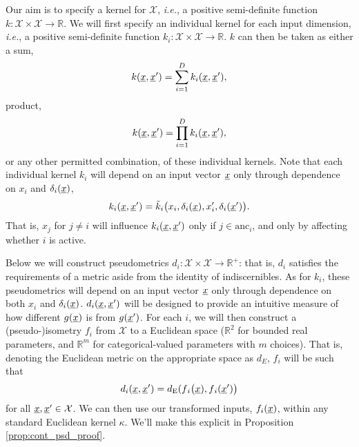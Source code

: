 \documentclass[letterpaper]{article}
\newcommand{\vect}[1]{\underline{\smash{#1}}}
\renewcommand{\v}[1]{\vect{#1}}
\newcommand{\reals}{\mathds{R}}
\newcommand{\sX}{\mathcal{X}}
\begin{document}
Our aim is to specify a kernel for $\sX$, \emph{i.e.}, a positive semi-definite function  $k\colon \sX \times \sX \to \reals$. We will first specify an individual kernel for each input dimension, \emph{i.e.}, a positive semi-definite function $k_i\colon \sX \times \sX \to \reals$. $k$ can then be taken as either a sum,
\begin{equation}
 k(\v{x}, \v{x}') = \sum_{i=1}^D k_i(\v{x},\v{x}'),
\end{equation}
product,
\begin{equation}
 k(\v{x}, \v{x}') = \prod_{i=1}^D k_i(\v{x},\v{x}'),
\end{equation}
or any other permitted combination, of these individual kernels. Note that each individual kernel $k_i$ will depend on an input vector $\v{x}$ only through dependence on $x_i$ and $\delta_i(\v{x})$,
\begin{equation}
  k_i(\v{x},\v{x}') = \tilde{k}_i\bigl(x_i,\delta_i(\v{x}),x_i', \delta_i(\v{x}') \bigr).
\end{equation}
That is, $x_j$ for $j\neq i$ will influence $k_i(\v{x},\v{x}')$ only if $j \in \text{anc}_i$, and only by affecting whether $i$ is active.

Below we will construct pseudometrics $d{_i}\colon \sX \times \sX \to \reals^+$: that is, $d_i$ satisfies the requirements of a metric aside from the identity of indiscernibles. As for $k_i$, these pseudometrics will depend on an input vector $\v{x}$ only through dependence on both $x_i$ and $\delta_i(\v{x})$. $d{_i}(\v{x}, \v{x}')$ will be designed to provide an intuitive measure of how different $g(\v{x})$ is from $g(\v{x}')$. 
For each $i$, we will then construct a (pseudo-)isometry $f_i$ from
$\sX$ 
to a Euclidean space ($\reals^2$ for bounded real parameters, and $\reals^m$ for categorical-valued parameters with $m$ choices). That is, denoting the Euclidean metric on the appropriate space as $d{_E}$, $f_i$ will be such that
\begin{equation}
\label{eqn:d_i}
 d{_i}(\v{x},\v{x}')
=
d_{\text{E}}(f{_i}\bigl(\v{x}), f{_i}(\v{x}')\bigr)
\end{equation}
for all $\v{x}, \v{x}' \in \sX$. We can then use our transformed inputs, $f_i(\v{x})$, within any standard Euclidean kernel $\kappa$. We'll make this explicit in Proposition \ref{prop:cont_psd_proof}. 
\end{document}
